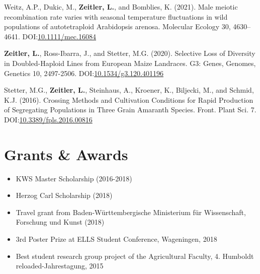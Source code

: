 \documentclass[margin]{res}
\begin{document}
\begin{resume}
\begin{etaremune}
\item Weitz, A.P., Dukic, M., \textbf{Zeitler, L.}, and Bomblies, K. (2021). Male meiotic recombination rate varies with seasonal temperature fluctuations in wild populations of autotetraploid Arabidopsis arenosa. Molecular Ecology 30, 4630–4641. DOI:\href{https://doi.org/10.1111/mec.16084}{10.1111/mec.16084}

\item \textbf{Zeitler, L.}, Ross-Ibarra, J., and Stetter, M.G. (2020). Selective Loss of Diversity in Doubled-Haploid Lines from European Maize Landraces. G3: Genes, Genomes, Genetics 10, 2497-2506. DOI:\href{https://doi.org/10.1534/g3.120.401196}{10.1534/g3.120.401196}

\item Stetter, M.G., \textbf{Zeitler, L.}, Steinhaus, A., Kroener, K., Biljecki, M., and Schmid, K.J. (2016). Crossing Methods and Cultivation Conditions for Rapid Production of Segregating Populations in Three Grain Amaranth Species. Front. Plant Sci. 7. DOI:\href{https://doi.org/10.3389/fpls.2016.00816}{10.3389/fpls.2016.00816}
  
\end{etaremune}



\section{Grants \& Awards} 
\begin{itemize}\itemsep -2pt %
\item KWS Master Scholarship (2016-2018)
\item Herzog Carl Scholarship (2018)
\item Travel grant from Baden-Württembergische Ministerium für Wissenschaft, Forschung und Kunst (2018)
\item 3rd Poster Prize at ELLS Student Conference, Wageningen, 2018
\item Best student research group project of the Agricultural Faculty, 4. Humboldt reloaded-Jahrestagung, 2015
\end{itemize}




\end{resume}
\end{document}

